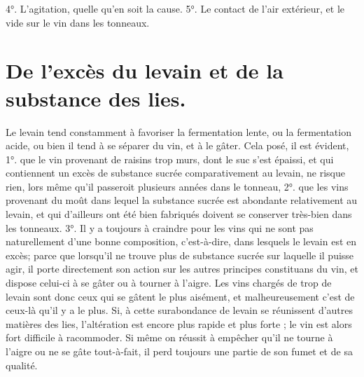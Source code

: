 4°. L'agitation, quelle qu'en soit la cause.
5°. Le contact de l'air extérieur, et le vide sur le vin dans les tonneaux.\setcounter{page}{324} \section{De l'excès du levain et de la substance des lies.}
Le levain tend constamment à favoriser la fermentation lente, ou la fermentation acide, ou bien il tend à se séparer du vin, et à le gâter. Cela posé, il est évident, 1°. que le vin provenant de raisins trop murs, dont le suc s'est épaissi, et qui contiennent un excès de substance sucrée comparativement au levain, ne risque rien, lors même qu'il passeroit plusieurs années dans le tonneau, 2°. que les vins provenant du moût dans lequel la substance sucrée est abondante relativement au levain, et qui d'ailleurs ont été bien fabriqués doivent se conserver très-bien dans les tonneaux. 3°. Il y a toujours à craindre pour les vins qui ne sont pas naturellement d'une bonne composition, c'est-à-dire, dans lesquels le levain est en excès; parce que lorsqu'il ne trouve plus de substance sucrée sur laquelle il puisse agir, il porte directement son action sur les autres principes constituans du vin, et dispose celui-ci à se gâter ou à tourner à l'aigre. Les vins chargés de trop de levain sont donc ceux qui se gâtent le plus aisément, et malheureusement c'est de ceux-là qu'il y a le plus. Si, à cette surabondance de levain se réunissent d'autres matières des lies, l'altération est encore plus rapide et plus\setcounter{page}{325} forte ; le vin est alors fort difficile à racommoder. Si même on réussit à empêcher qu'il ne tourne à l'aigre ou ne se gâte tout-à-fait, il perd toujours une partie de son fumet et de sa qualité.
